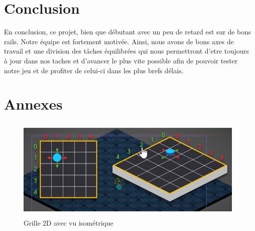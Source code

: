
\section{Conclusion}
En conclusion, ce projet, bien que débutant avec un peu de retard est sur de bons rails. Notre équipe est fortement motivée. Ainsi, nous avons de bons axes de travail et une division des tâches équilibrées qui nous permettront d'etre toujours à jour dans nos taches et d'avancer le plus vite possible afin de pouvoir tester notre jeu et de profiter de celui-ci dans les plus brefs délais.
 
\section{Annexes}


\begin{figure}[h]
    \includegraphics[height=5cm]{images/isovs.png} 
    \caption{Grille 2D avec vu isométrique}
    \label{fig:subim1}
\end{figure}

